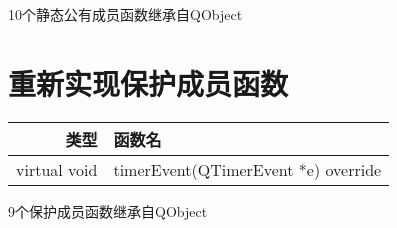 \begin{compactitem}
\item 10个静态公有成员函数继承自QObject
\end{compactitem}

\section{重新实现保护成员函数}


\begin{tabular}{|r|l|}
	\hline
	类型	 & 函数名 \\
	\hline
virtual void	& timerEvent(QTimerEvent *e) override \\ 
\hline
\end{tabular}


\begin{compactitem}
\item 9个保护成员函数继承自QObject
\end{compactitem}







